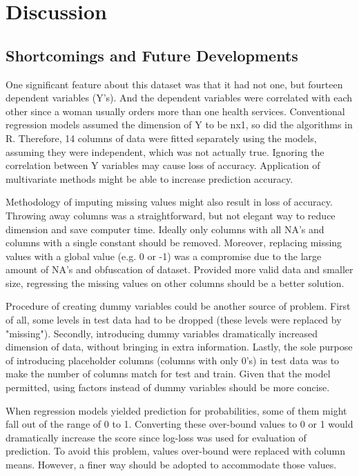 \documentclass{article}\usepackage[]{graphicx}\usepackage[]{color}
\begin{document}
\section{Discussion} 
\label{sec:discussion}

\subsection{Shortcomings and Future Developments}
One significant feature about this dataset was that it had not one, but fourteen dependent variables (Y's). And the dependent variables were correlated with each other since a woman usually orders more than one health services. Conventional regression models assumed the dimension of Y to be nx1, so did the algorithms in R. Therefore, 14 columns of data were fitted separately using the models, assuming they were independent, which was not actually true. Ignoring the correlation between Y variables may cause loss of accuracy. Application of multivariate methods might be able to increase prediction accuracy.

Methodology of imputing missing values might also result in loss of accuracy. Throwing away columns was a straightforward, but not elegant way to reduce dimension and save computer time. Ideally only columns with all NA's and columns with a single constant should be removed. Moreover, replacing missing values with a global value (e.g. 0 or -1) was a compromise due to the large amount of NA's and obfuscation of dataset. Provided more valid data and smaller size, regressing the missing values on other columns should be a better solution.

Procedure of creating dummy variables could be another source of problem. First of all, some levels in test data had to be dropped (these levels were replaced by "missing"). Secondly, introducing dummy variables dramatically increased dimension of data, without bringing in extra information. Lastly, the sole purpose of introducing placeholder columns (columns with only 0's) in test data was to make the number of columns match for test and train. Given that the model permitted, using factors instead of dummy variables should be more concise.

When regression models yielded prediction for probabilities, some of them might fall out of the range of 0 to 1. Converting these over-bound values to 0 or 1 would dramatically increase the score since log-loss was used for evaluation of prediction. To avoid this problem, values over-bound were replaced with column means. However, a finer way should be adopted to accommodate those values.  
\end{document}
